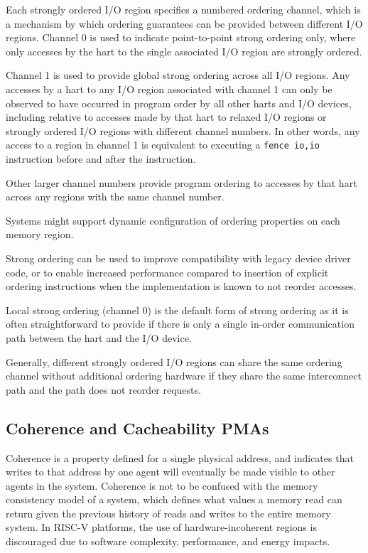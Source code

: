 Each strongly ordered I/O region specifies a numbered ordering
channel, which is a mechanism by which ordering guarantees can be
provided between different I/O regions.  Channel 0 is used to indicate
point-to-point strong ordering only, where only accesses by the hart to the
single associated I/O region are strongly ordered.

Channel 1 is used to provide global strong ordering across all I/O
regions.  Any accesses by a hart to any I/O region associated with
channel 1 can only be observed to have occurred in program order by all
other harts and I/O devices, including relative to accesses made by
that hart to relaxed I/O regions or strongly ordered I/O regions with
different channel numbers.  In other words, any access to a region in
channel 1 is equivalent to executing a {\tt fence io,io}
instruction before and after the instruction.

Other larger channel numbers provide program ordering to accesses by
that hart across any regions with the same channel number.

Systems might support dynamic configuration of ordering properties on
each memory region.

\begin{commentary}
Strong ordering can be used to improve compatibility with legacy
device driver code, or to enable increased performance compared to
insertion of explicit ordering instructions when the implementation is
known to not reorder accesses.

Local strong ordering (channel 0) is the default form of strong
ordering as it is often straightforward to provide if there is only a
single in-order communication path between the hart and the I/O
device.

Generally, different strongly ordered I/O regions can share the same
ordering channel without additional ordering hardware if they share
the same interconnect path and the path does not reorder requests.
\end{commentary}

\subsection{Coherence and Cacheability PMAs}

Coherence is a property defined for a single physical address, and
indicates that writes to that address by one agent will eventually be
made visible to other agents in the system.  Coherence is not to be
confused with the memory consistency model of a system, which defines
what values a memory read can return given the previous history of
reads and writes to the entire memory system.  In RISC-V platforms,
the use of hardware-incoherent regions is discouraged due to software
complexity, performance, and energy impacts.

